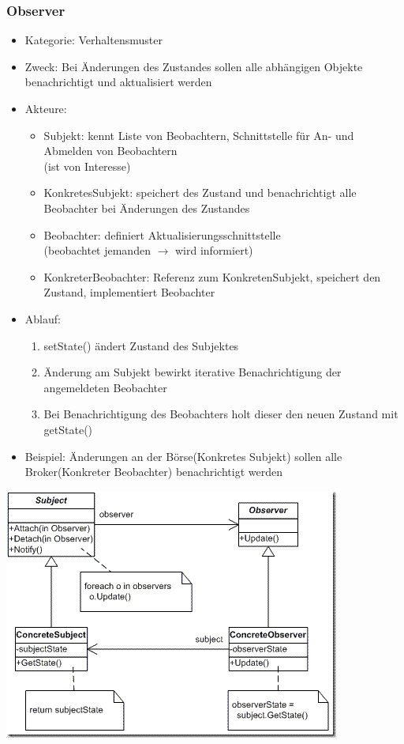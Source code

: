 \documentclass[11pt, fleqn, a4paper, leqno]{scrartcl} %
\begin{document}
		\subsubsection{Observer}
			\begin{itemize}
				\item Kategorie: Verhaltensmuster
				\item Zweck: Bei Änderungen des Zustandes sollen alle abhängigen Objekte benachrichtigt und aktualisiert werden 
				\item Akteure:
					\begin{itemize}
						\item Subjekt: kennt Liste von Beobachtern, Schnittstelle für An- und Abmelden von Beobachtern\\
						(ist von Interesse)
						\item KonkretesSubjekt: speichert des Zustand und benachrichtigt alle Beobachter bei Änderungen des Zustandes
						\item Beobachter: definiert Aktualisierungsschnittstelle\\
						(beobachtet jemanden $\rightarrow$ wird informiert)
						\item KonkreterBeobachter: Referenz zum KonkretenSubjekt, speichert den Zustand, implementiert Beobachter
					\end{itemize}
				\item Ablauf:
					\begin{enumerate}
						\item setState() ändert Zustand des Subjektes
						\item Änderung am Subjekt bewirkt iterative Benachrichtigung der angemeldeten Beobachter
						\item Bei Benachrichtigung des Beobachters holt dieser den neuen Zustand mit getState()
					\end{enumerate}
				\item Beispiel: Änderungen an der Börse(Konkretes Subjekt) sollen alle Broker(Konkreter Beobachter) benachrichtigt werden
			\end{itemize}
			\includegraphics[scale=0.5]{images/observer.png}
		\newpage
\end{document}

